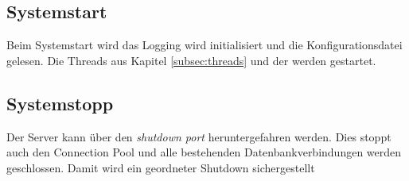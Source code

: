 \subsection{Systemstart}\label{subsec:systemstart}
Beim Systemstart wird das Logging wird initialisiert und die Konfigurationsdatei gelesen. Die Threads aus Kapitel \ref{subsec:threads} und der  werden gestartet.

\subsection{Systemstopp}\label{subsec:systemstopp}
Der Server kann über den \emph{shutdown port} heruntergefahren werden. Dies stoppt auch den Connection Pool und alle bestehenden Datenbankverbindungen werden geschlossen. Damit wird ein geordneter Shutdown sichergestellt
